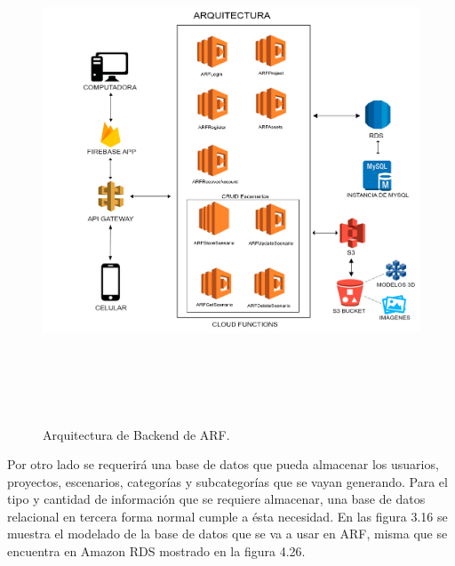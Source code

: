\begin{figure}[H]
	\centering
	\includegraphics[width=15cm,height=15cm]{imagenes/desarrollo/arquitectura/ArchitecturaBackend.png}
	\caption{Arquitectura de Backend de ARF.}
	\label{fig:arqbackend}
\end{figure}
\par
Por otro lado se requerirá una base de datos que pueda almacenar los usuarios, proyectos, escenarios, categorías y subcategorías que se vayan generando. Para el tipo y cantidad de información que se requiere almacenar, una base de datos relacional en tercera forma normal cumple a ésta necesidad.
En las figura 3.16 se muestra el modelado de la base de datos que se va a usar en ARF, misma que se encuentra en Amazon RDS mostrado en la figura 4.26.
